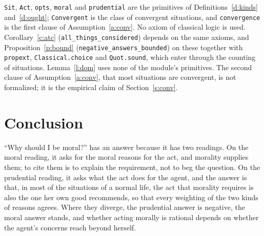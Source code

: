\documentclass{situationist-preprint}
\begin{document}
\texttt{Sit}, \texttt{Act}, \texttt{opts}, \texttt{moral} and \texttt{prudential} are the primitives of Definitions~\ref{d:kinds} and~\ref{d:ought}; \texttt{Convergent} is the class of convergent situations, and \texttt{convergence} is the first clause of Assumption~\ref{a:conv}. No axiom of classical logic is used. Corollary~\ref{c:atc} (\texttt{all\_things\_considered}) depends on the same axioms, and Proposition~\ref{p:bound} (\texttt{negative\_answers\_bounded}) on these together with \texttt{propext}, \texttt{Classical.choice} and \texttt{Quot.sound}, which enter through the counting of situations. Lemma~\ref{l:dom} uses none of the module's primitives. The second clause of Assumption~\ref{a:conv}, that most situations are convergent, is not formalized; it is the empirical claim of Section~\ref{s:conv}.

\section{Conclusion}

\enquote{Why should I be moral?} has an answer because it has two readings. On the moral reading, it asks for the moral reasons for the act, and morality supplies them; to cite them is to explain the requirement, not to beg the question. On the prudential reading, it asks what the act does for the agent, and the answer is that, in most of the situations of a normal life, the act that morality requires is also the one her own good recommends, so that every weighting of the two kinds of reasons agrees. Where they diverge, the prudential answer is negative, the moral answer stands, and whether acting morally is rational depends on whether the agent's concerns reach beyond herself.
\end{document}
